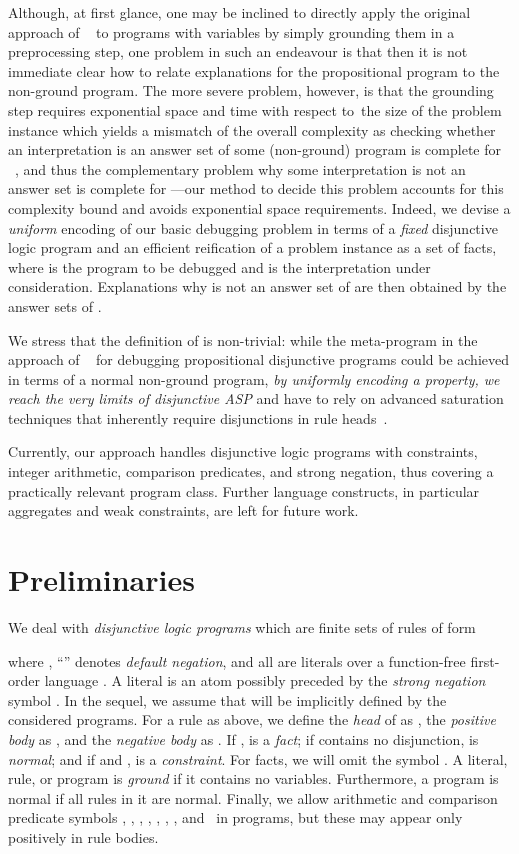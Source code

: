 \documentclass{tlp}
\newcommand{\wrt}{with respect to}
\begin{document}
Although, at first glance, one may be inclined to directly apply the original approach of ~\citeyear{gebser08}
to programs with variables by simply
grounding them in a preprocessing step, one problem in such an endeavour is that then it is not immediate clear how to 
relate explanations for the propositional program to the non-ground program. The more severe problem, however,
is that the grounding step requires exponential space and time \wrt\ the size of the problem instance which yields a mismatch of the overall complexity as
checking whether an interpretation is an answer set of some (non-ground) program is complete
for ~\cite{eiter04}, and thus the complementary problem why some interpretation is not
an answer set is complete for ---our method to decide this problem accounts
for this complexity bound and avoids exponential space requirements.
Indeed, we devise a \emph{uniform} encoding of our basic debugging problem in terms of a \emph{fixed} disjunctive logic program  and an efficient reification of 
a problem instance as a set  of facts, where  is the program to be debugged and  is the interpretation under consideration.
Explanations why  is not an answer set of  are then obtained by the answer sets of .

We stress that the definition of   is  non-trivial: while the meta-program in the approach of ~\citeyear{gebser08} for debugging propositional disjunctive programs
could be achieved in terms of a normal non-ground program, \emph{by uniformly encoding a  property, we reach the very limits of disjunctive ASP} and have to rely on advanced saturation techniques that inherently require disjunctions in rule heads~\cite{eiter97}.

Currently, our approach handles disjunctive logic programs with  constraints,
integer arithmetic, comparison predicates, and strong negation, thus covering 
a practically relevant program class. Further language constructs, in particular
aggregates and weak constraints, are left for future work.


\section{Preliminaries}\label{sec:prel}

We deal with \emph{disjunctive logic programs}  which are finite sets of rules of form

where , ``'' denotes \emph{default negation}, and  all  are literals over 
a function-free first-order language . A literal is an atom possibly preceded by the \emph{strong negation} symbol .
In the sequel, we assume that  will be implicitly defined by the considered programs.
For a rule  as above, we define the \emph{head}  of  as , 
the \emph{positive body} as , and  the \emph{negative body} as . 
If ,
  is a \emph{fact}; if  contains no disjunction,  is \emph{normal}; and
if  and ,
 is a \emph{constraint}. For facts, we will omit the symbol .
A literal, rule, or program is \emph{ground} if it contains no variables.
Furthermore, a program is normal if all rules in it are normal. 
Finally, we allow arithmetic and comparison predicate symbols , , , , , , , and~ in programs, but these may appear only positively in rule bodies.
\end{document}
